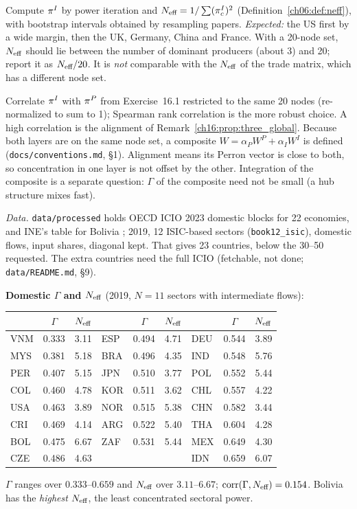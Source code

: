 \documentclass[../solutions_manual.tex]{subfiles}
\begin{document}
 Compute $\pi^I$ by power iteration and $N_{\text{eff}} = 1/\sum(\pi^I_c)^2$ (Definition~\ref{ch06:def:neff}), with bootstrap intervals obtained by resampling papers. \emph{Expected:} the US first by a wide margin, then the UK, Germany, China and France. With a 20-node set, $N_{\text{eff}}$ should lie between the number of dominant producers (about 3) and 20; report it as $N_{\text{eff}}/20$. It is \emph{not} comparable with the $N_{\text{eff}}$ of the trade matrix, which has a different node set.

 Correlate $\pi^I$ with $\pi^P$ from Exercise~16.1 restricted to the same 20 nodes (re-normalized to sum to 1); Spearman rank correlation is the more robust choice. A high correlation is the alignment of Remark~\ref{ch16:prop:three_global}. Because both layers are on the same node set, a composite $W = \alpha_PW^P + \alpha_IW^I$ is defined (\nolinkurl{docs/conventions.md}, \S1). Alignment means its Perron vector is close to both, so concentration in one layer is not offset by the other. Integration of the composite is a separate question: $\Gamma$ of the composite need not be small (a hub structure mixes fast).


\emph{Data.} \nolinkurl{data/processed} holds OECD ICIO 2023 domestic blocks for 22 economies, and INE's table for Bolivia \citep{oecd2023icio,ine2026sut}; 2019, 12 ISIC-based sectors (\nolinkurl{book12_isic}), domestic flows, input shares, diagonal kept. That gives 23 countries, below the 30--50 requested. The extra countries need the full ICIO (fetchable, not done; \nolinkurl{data/README.md}, \S9).

 \textbf{Domestic $\Gamma$ and $N_{\text{eff}}$} (2019, $N = 11$ sectors with intermediate flows):
\begin{center}
\small
\begin{tabular}{lcc|lcc|lcc}
\toprule
& $\Gamma$ & $N_{\text{eff}}$ & & $\Gamma$ & $N_{\text{eff}}$ & & $\Gamma$ & $N_{\text{eff}}$ \\
\midrule
VNM & 0.333 & 3.11 & ESP & 0.494 & 4.71 & DEU & 0.544 & 3.89 \\
MYS & 0.381 & 5.18 & BRA & 0.496 & 4.35 & IND & 0.548 & 5.76 \\
PER & 0.407 & 5.15 & JPN & 0.510 & 3.77 & POL & 0.552 & 5.44 \\
COL & 0.460 & 4.78 & KOR & 0.511 & 3.62 & CHL & 0.557 & 4.22 \\
USA & 0.463 & 3.89 & NOR & 0.515 & 5.38 & CHN & 0.582 & 3.44 \\
CRI & 0.469 & 4.14 & ARG & 0.522 & 5.40 & THA & 0.604 & 4.28 \\
BOL & 0.475 & 6.67 & ZAF & 0.531 & 5.44 & MEX & 0.649 & 4.30 \\
CZE & 0.486 & 4.63 & & & & IDN & 0.659 & 6.07 \\
\bottomrule
\end{tabular}
\end{center}
$\Gamma$ ranges over $0.333$--$0.659$ and $N_{\text{eff}}$ over $3.11$--$6.67$; $\operatorname{corr}(\Gamma, N_{\text{eff}}) = 0.154$. Bolivia has the \emph{highest} $N_{\text{eff}}$, the least concentrated sectoral power.
\end{document}
